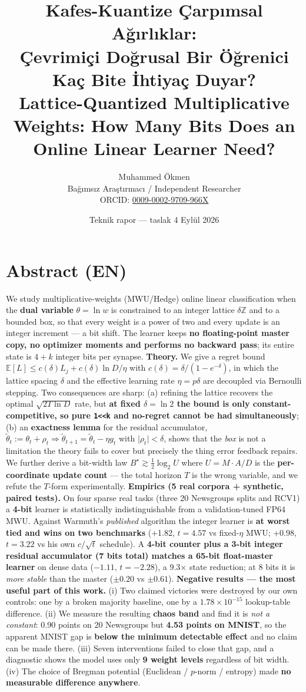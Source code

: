 \documentclass[11pt]{article}
\title{Kafes-Kuantize Çarpımsal Ağırlıklar:\\Çevrimiçi Doğrusal Bir Öğrenici Kaç Bite İhtiyaç Duyar?\\[4pt]\large Lattice-Quantized Multiplicative Weights: How Many Bits Does an Online Linear Learner Need?}
\author{Muhammed Ökmen\\Bağımsız Araştırmacı / Independent Researcher\\ORCID: \href{https://orcid.org/0009-0002-9709-966X}{0009-0002-9709-966X}}
\date{Teknik rapor --- taslak 4 Eylül 2026}
\begin{document}
\maketitle
\section*{Abstract (EN)}
We study multiplicative-weights (MWU/Hedge) online linear classification when the \textbf{dual variable} $\theta=\ln w$ is constrained to an integer lattice $\delta\mathbb{Z}$ and to a bounded box, so that every weight is a power of two and every update is an integer increment — a bit shift. The learner keeps \textbf{no floating-point master copy, no optimizer moments and performs no backward pass}; its entire state is $4{+}k$ integer bits per synapse.
\textbf{Theory.} We give a regret bound $\mathbb{E}[L]\le c(\delta)L_j+c(\delta)\ln D/\eta$ with $c(\delta)=\delta/(1-e^{-\delta})$, in which the lattice spacing $\delta$ and the effective learning rate $\eta=p\delta$ are decoupled via Bernoulli stepping. Two consequences are sharp: (a) refining the lattice recovers the optimal $\sqrt{2T\ln D}$ rate, but \textbf{at fixed $\delta=\ln2$ the bound is only constant-competitive, so pure \texttt{1<<k} and no-regret cannot be had simultaneously}; (b) an \textbf{exactness lemma} for the residual accumulator, $\tilde\theta_t:=\theta_t+\rho_t \Rightarrow \tilde\theta_{t+1}=\tilde\theta_t-\eta g_t$ with $\lvert\rho_t\rvert<\delta$, shows that the \emph{box} is not a limitation the theory fails to cover but precisely the thing error feedback repairs. We further derive a bit-width law $B^\star\gtrsim\tfrac12\log_2 U$ where $U=M\!\cdot\!A/D$ is the \textbf{per-coordinate update count} — the total horizon $T$ is the wrong variable, and we refute the $T$-form experimentally.
\textbf{Empirics (5 real corpora + synthetic, paired tests).} On four sparse real tasks (three 20 Newsgroups splits and RCV1) a \textbf{4-bit} learner is statistically indistinguishable from a validation-tuned FP64 MWU. Against Warmuth's \emph{published} algorithm the integer learner is \textbf{at worst tied and wins on two benchmarks} (+1.82, $t{=}4.57$ vs fixed-$\eta$ MWU; +0.98, $t{=}3.22$ vs his own $c/\sqrt t$ schedule). A \textbf{4-bit counter plus a 3-bit integer residual accumulator (7 bits total) matches a 65-bit float-master learner} on dense data ($-1.11$, $t{=}-2.28$), a 9.3× state reduction; at 8 bits it is \emph{more stable} than the master ($\pm0.20$ vs $\pm0.61$).
\textbf{Negative results — the most useful part of this work.} (i) Two claimed victories were destroyed by our own controls: one by a broken majority baseline, one by a $1.78\times10^{-15}$ lookup-table difference. (ii) We measure the resulting \textbf{chaos band} and find it is \emph{not a constant}: 0.90 points on 20 Newsgroups but \textbf{4.53 points on MNIST}, so the apparent MNIST gap is \textbf{below the minimum detectable effect} and no claim can be made there. (iii) Seven interventions failed to close that gap, and a diagnostic shows the model uses only \textbf{9 weight levels} regardless of bit width. (iv) The choice of Bregman potential (Euclidean / $p$-norm / entropy) made \textbf{no measurable difference anywhere}.
\end{document}
